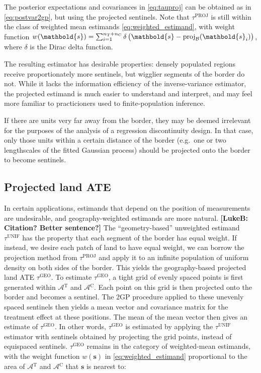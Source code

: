 \documentclass[letter]{article}
\newcommand{\area}{\mathcal{A}}
\newcommand{\treat}{\mathrm{T}}
\newcommand{\ctrol}{\mathrm{C}}
\newcommand{\treatarea}{\area{}^{\treat}}
\newcommand{\ctrolarea}{\area{}^{\ctrol}}
\newcommand{\svec}{\mathbold{s}}
\newcommand{\boundary}{\mathcal{B}}
\newcommand{\unifavg}{\tau^{\mathrm{UNIF}}}
\newcommand{\tauproj}{\tau^{\mathrm{PROJ}}}
\newcommand{\taugeo}{\tau^{\mathrm{GEO}}}
\DeclareMathOperator{\proj}{proj}
\begin{document}
The posterior expectations and covariances in \eqref{eq:tauproj} can be obtained as in \eqref{eq:postvar2gp}, but using the projected sentinels.
Note that \(\tauproj\) is still within the class of weighted mean estimands \eqref{eq:weighted_estimand},
with weight function \(w(\svec) = \sum_{i=1}^{n_\treat{}+n_\ctrol{}} \delta\del{ \svec - \proj_\boundary(\svec_i)}\), where \(\delta\) is the Dirac delta function.

The resulting estimator has desirable properties: densely populated regions receive proportionately more sentinels, but wigglier segments of the border do not.
While it lacks the information efficiency of the inverse-variance estimator,
the projected estimand is much easier to understand and interpret,
and may feel more familiar to practicioners used to finite-population inference.

If there are units very far away from the border,
they may be deemed irrelevant for the purposes of the analysis of a regression discontinuity design. In that case, only those units within a certain distance of the border (e.g.~one or two lengthscales of the fitted Gaussian process) should be projected onto the border to become sentinels.
    


    	\subsection{Projected land ATE}\label{projected-land-ate}

In certain applications, estimands that depend on the position of measurements are undesirable, and geography-weighted estimands are more natural. \textbf{{[}LukeB: Citation? Better sentence?{]}}
The ``geometry-based'' unweighted estimand \(\unifavg\) has the property that each segment of the border has equal weight.
If instead, we desire each patch of land to have equal weight, we can borrow the projection method from \(\tauproj\) and apply it to an infinite population of uniform density on both sides of the border.
This yields the geography-based projected land ATE \(\taugeo\).
To estimate \(\taugeo\), a tight grid of evenly spaced points is first generated within \(\treatarea\) and \(\ctrolarea\).
Each point on this grid is then projected onto the border and becomes a sentinel.
The 2GP procedure applied to these unevenly spaced sentinels then yields a mean vector and covariance matrix for the treatment effect at these positions.
The mean of the mean vector then gives an estimate of \(\taugeo\).
In other words, \(\taugeo\) is estimated by applying the \(\unifavg\) estimator with sentinels obtained by projecting the grid points, instead of equispaced sentinels.
\(\taugeo\) remains in the category of weighted-mean estimands, with the weight function \(w(\svec)\) in \eqref{eq:weighted_estimand} proportional to the area of \(\treatarea\) and \(\ctrolarea\) that \(\svec\) is nearest to:
\end{document}

